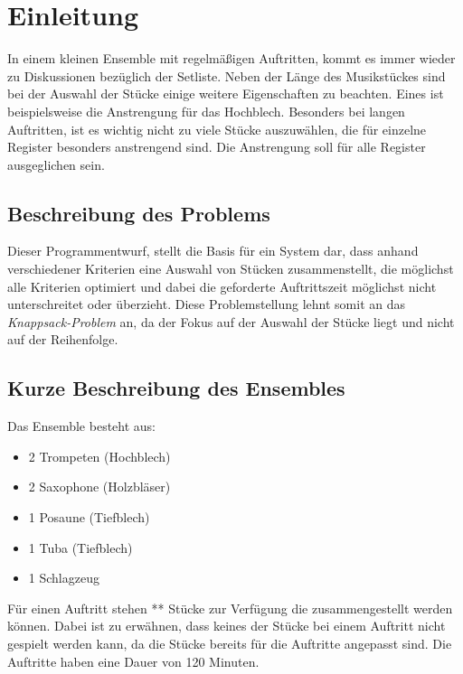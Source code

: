 \section{Einleitung}\label{sec:einleitung}
In einem kleinen Ensemble mit regelmäßigen Auftritten, kommt es immer wieder zu Diskussionen 
bezüglich der Setliste. Neben der Länge des Musikstückes sind bei der Auswahl der Stücke einige 
weitere Eigenschaften zu beachten. Eines ist beispielsweise die Anstrengung für das Hochblech. 
Besonders bei langen Auftritten, ist es wichtig nicht zu viele Stücke auszuwählen, die 
für einzelne Register besonders anstrengend sind. Die Anstrengung soll für alle Register ausgeglichen sein.
\subsection{Beschreibung des Problems}
 Dieser Programmentwurf, stellt die Basis für ein System dar, dass anhand verschiedener Kriterien eine 
 Auswahl von Stücken zusammenstellt, die möglichst alle Kriterien optimiert und dabei die 
 geforderte Auftrittszeit möglichst nicht unterschreitet oder überzieht. Diese Problemstellung lehnt somit an das \textit{Knappsack-Problem} an, 
 da der Fokus auf der Auswahl der Stücke liegt und nicht auf der Reihenfolge.
 
\subsection{Kurze Beschreibung des Ensembles}
Das Ensemble besteht aus: 
\begin{itemize}
    \item 2 Trompeten (Hochblech)
    \item 2 Saxophone (Holzbläser)
    \item 1 Posaune (Tiefblech)
    \item 1 Tuba (Tiefblech)
    \item 1 Schlagzeug 
\end{itemize} 

Für einen Auftritt stehen ** Stücke zur Verfügung die zusammengestellt werden können. Dabei ist zu erwähnen, dass keines
der Stücke bei einem Auftritt nicht gespielt werden kann, da die Stücke bereits für die Auftritte angepasst sind.
Die Auftritte haben eine Dauer von 120 Minuten.
